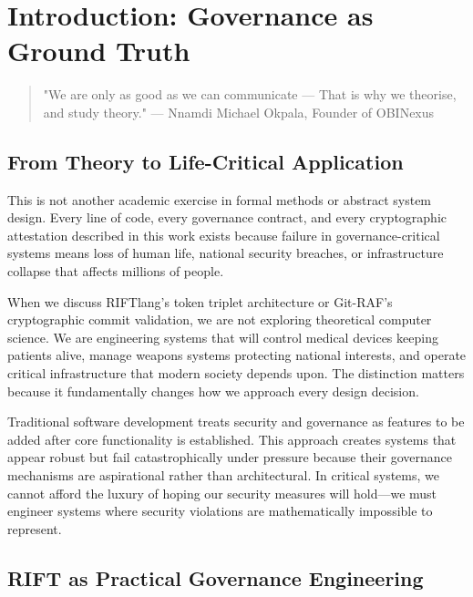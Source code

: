 \chapter*{Introduction: Governance as Ground Truth}

\begin{quote}
"We are only as good as we can communicate — That is why we theorise, and study theory."
\hfill--- Nnamdi Michael Okpala, Founder of OBINexus
\end{quote}

\section*{From Theory to Life-Critical Application}

This is not another academic exercise in formal methods or abstract system design. Every line of code, every governance contract, and every cryptographic attestation described in this work exists because failure in governance-critical systems means loss of human life, national security breaches, or infrastructure collapse that affects millions of people.

When we discuss RIFTlang's token triplet architecture or Git-RAF's cryptographic commit validation, we are not exploring theoretical computer science. We are engineering systems that will control medical devices keeping patients alive, manage weapons systems protecting national interests, and operate critical infrastructure that modern society depends upon. The distinction matters because it fundamentally changes how we approach every design decision.

Traditional software development treats security and governance as features to be added after core functionality is established. This approach creates systems that appear robust but fail catastrophically under pressure because their governance mechanisms are aspirational rather than architectural. In critical systems, we cannot afford the luxury of hoping our security measures will hold—we must engineer systems where security violations are mathematically impossible to represent.

\section*{RIFT as Practical Governance Engineering}

